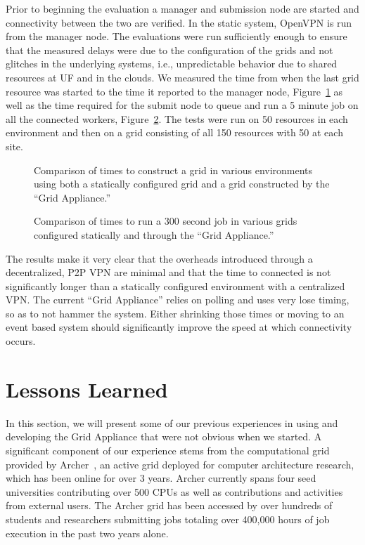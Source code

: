 \documentclass[conference]{IEEEtran}
\begin{document}
Prior to beginning the evaluation a manager and submission node are started and
connectivity between the two are verified.  In the static system, OpenVPN is
run from the manager node.  The evaluations were run sufficiently enough to
ensure that the measured delays were due to the configuration of the grids and
not glitches in the underlying systems, i.e., unpredictable behavior due to
shared resources at UF and in the clouds.  We measured the time from when the
last grid resource was started to the time it reported to the manager node,
Figure~\ref{fig:connect} as well as the time required for the submit node to
queue and run a 5 minute job on all the connected workers,
Figure~\ref{fig:run}.  The tests were run on 50 resources in each environment
and then on a grid consisting of all 150 resources with 50 at each site.

\begin{figure}[ht]
\centering
{}
\caption{Comparison of times to construct a grid in various environments using
both a statically configured grid and a grid constructed by the ``Grid Appliance.''}
\label{fig:connect}
\end{figure}

\begin{figure}[ht]
\centering
{}
\caption{Comparison of times to run a 300 second job in various grids configured
statically and through the ``Grid Appliance.''}
\label{fig:run}
\end{figure}

The results make it very clear that the overheads introduced through a
decentralized, P2P VPN are minimal and that the time to connected is not
significantly longer than a statically configured environment with a
centralized VPN.  The current ``Grid Appliance'' relies on polling and uses
very lose timing, so as to not hammer the system.  Either shrinking those times
or moving to an event based system should significantly improve the speed at
which connectivity occurs.  

\section{Lessons Learned}
\label{lessons_learned}

In this section, we will present some of our previous experiences in using and
developing the Grid Appliance that were not obvious when we started.  A
significant component of our experience stems from the computational grid
provided by Archer~\cite{archer}, an active grid deployed for computer
architecture research, which has been online for over 3 years.  Archer
currently spans four seed universities contributing over 500 CPUs as well as
contributions and activities from external users.  The Archer grid has been
accessed by over hundreds of students and researchers submitting jobs totaling
over 400,000 hours of job execution in the past two years alone.
\end{document}
